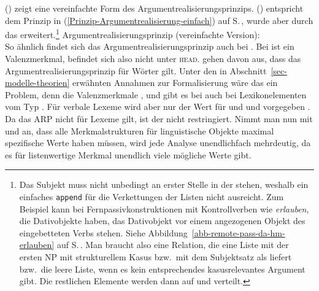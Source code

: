 {\noindent
() zeigt eine vereinfachte Form des Argumentrealisierungsprinzips. () entspricht dem 
Prinzip in (\ref{Prinzip-Argumentrealisierung-einfach}) auf
S.\,\pageref{Prinzip-Argumentrealisierung-einfach}, wurde aber durch das \subjm
erweitert.\footnote{%
Das Subjekt muss nicht unbedingt an erster Stelle in der \argstl stehen, weshalb ein einfaches
\texttt{append} für die Verkettungen der Listen nicht ausreicht. Zum Beispiel kann bei
Fernpassivkonstruktionen mit Kontrollverben wie \emph{erlauben}, die Dativobjekte haben, das
Dativobjekt vor einem angezogenen Objekt des eingebetteten Verbs stehen. Siehe
Abbildung~\ref{abb-remote-pass-da-hm-erlauben} auf S.\,\pageref{abb-remote-pass-da-hm-erlauben}. Man
braucht also eine Relation, %
die eine Liste mit der ersten NP mit strukturellem Kasus bzw.\ mit dem Subjektsatz als \subjw
liefert bzw.\ die leere Liste, wenn es kein entsprechendes kasusrelevantes Argument gibt. Die restlichen Elemente werden dann auf \spr und \comps verteilt.
}
\ea
\label{Prinzip-Argumentrealisierung-einfach-SUBJ-zwei}%
Argumentrealisierungsprinzip (vereinfachte Version):\\[2pt]
 \impl
{}
\z
So ähnlich findet sich das Argumentrealisierungsprinzip auch bei \citet[23]{GSag2000a-u}. Bei
\citeauthor{GSag2000a-u} ist \subj ein Valenzmerkmal, befindet sich also nicht unter
\textsc{head}. \citeauthor{GSag2000a-u} gehen davon aus, dass das Argumentrealisierungsprinzip für
Wörter gilt. Unter den in Abschnitt~\ref{sec-modelle-theorien} erwähnten Annahmen zur Formalisierung wäre das ein Problem,
denn die Valenzmerkmale \subj, \spr und \comps gibt es bei \citet[361]{GSag2000a-u} auch bei
Lexikonelementen vom Typ . Für verbale Lexeme wird aber nur der Wert für \argst und \subj und \spr
vorgegeben \citep[22]{GSag2000a-u}. Da das ARP nicht für Lexeme gilt, ist der \compsw nicht restringiert. Nimmt man nun mit
\citet[17--18]{ps2} und \citet{Richter2021a} an, dass alle Merkmalstrukturen für linguistische Objekte
maximal spezifische Werte haben müssen, wird jede Analyse unendlichfach mehrdeutig, da es für
listenwertige Merkmal unendlich viele mögliche Werte gibt. 

}
